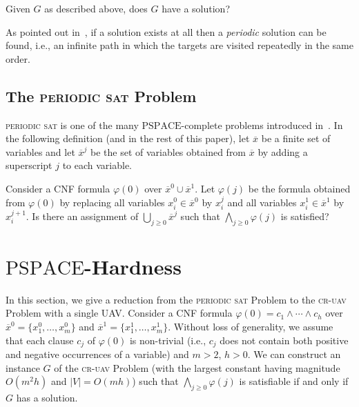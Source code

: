 \documentclass[envcountsame]{llncs}
\begin{document}
\begin{definition}
Given $G$ as described above, does $G$ have a solution?
\end{definition}

As pointed out in~\cite{Fargeas2013}, if a
solution exists at all then a \emph{periodic} solution can be found, i.e., an
infinite path in which the targets are visited repeatedly in the same
order.




\subsection{The \textsc{periodic sat} Problem}

\textsc{periodic sat} is one of the many $\mathrm{PSPACE}$-complete
problems introduced in~\cite{Orlin1981}.  In the following definition
(and in the rest of this paper), let $\overline{x}$ be a finite set of
variables and let $\overline{x}^j$ be the set of variables obtained
from $\overline{x}$ by adding a superscript $j$ to each variable.


\begin{definition}
Consider a CNF formula $\varphi(0)$ over $\overline{x}^0 \cup
\overline{x}^1$. Let $\varphi(j)$ be the formula obtained from
$\varphi(0)$ by replacing all variables $x_i^0 \in \overline{x}^0$ by
$x_i^j$ and all variables $x_i^1 \in \overline{x}^1$ by $x_i^{j+1}$.
Is there an assignment of $\bigcup_{j \geq 0} \overline{x}^j$ such
that $\bigwedge_{j \geq 0} \varphi(j)$ is satisfied?
\end{definition}








\section{$\mathrm{PSPACE}$-Hardness}

In this section, we give a reduction from the \textsc{periodic sat}
Problem to the \textsc{cr-uav} Problem with a single UAV\@.
Consider a CNF formula $\varphi(0) = c_1 \wedge \cdots \wedge c_h$
over $\overline{x}^0 = \{x_1^0, \ldots, x_m^0\}$ and $\overline{x}^1 =
\{x_1^1, \ldots, x_m^1\}$.  Without loss of generality, we assume that
each clause $c_j$ of $\varphi(0)$ is non-trivial (i.e., $c_j$ does not
contain both positive and negative occurrences of a variable) and $m >
2$, $h > 0$. We can construct an instance $G$ of the \textsc{cr-uav}
Problem (with the largest constant having magnitude $O(m^2h)$ and $|V|
= O(mh)$) such that $\bigwedge_{j \geq 0} \varphi(j)$ is satisfiable
if and only if $G$ has a solution.
\end{document}
